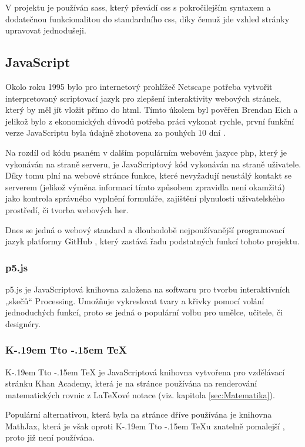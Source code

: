 \documentclass[a4paper, 12pt]{article}
\makeatletter
\newcommand*{\fullref}[1]{\hyperref[{#1}]{\ref*{#1}}}
\DeclareRobustCommand{\KaTeX}{%
  K\kern -.19em
  {\sbox \z@ T\vbox to\ht \z@ {\hbox{%
  \check@mathfonts
  \fontsize\sf@size\z@
  \selectfont A}%
  \vss}%
}\kern -.15em
\TeX}
\makeatother
\begin{document}
  V projektu je používán \gls{sass}, který převádí \gls{css} s pokročilejším syntaxem a dodatečnou funkcionalitou do standardního \gls{css}, díky čemuž jde vzhled stránky upravovat jednodušeji.


  \subsection{JavaScript} \label{sec:JavaScript}
  Okolo roku 1995 bylo pro internetový prohlížeč Netscape potřeba vytvořit interpretovaný scriptovací jazyk pro zlepšení interaktivity webových stránek, který by měl jít vložit přímo do \gls{html}. Tímto úkolem byl pověřen Brendan Eich a jelikož bylo z ekonomických důvodů potřeba práci vykonat rychle, první funkční verze JavaScriptu byla údajně zhotovena za pouhých 10 dní \cite{the-origin-of-javascript}.

  Na rozdíl od kódu psaném v dalším populárním webovém jazyce \gls{php}, který je vykonáván na straně serveru, je JavaScriptový kód vykonáván na straně uživatele. Díky tomu plní na webové stránce funkce, které nevyžadují neustálý kontakt se serverem (jelikož výměna informací tímto způsobem zpravidla není okamžitá) jako kontrola správného vyplnění formuláře, zajištění plynulosti uživatelského prostředí, či tvorba webových her.

  Dnes se jedná o webový standard a dlouhodobě nejpoužívanější programovací jazyk platformy GitHub \cite{github-statistics}, který zastává řadu podstatných funkcí tohoto projektu.


  \subsubsection{p5.js} \label{sec:p5.js}
  p5.js je JavaScriptová knihovna založena na softwaru pro tvorbu interaktivních „skečů“ Processing. Umožňuje vykreslovat tvary a křivky pomocí volání jednoduchých funkcí, proto se jedná o populární volbu pro umělce, učitele, či designéry.


  \subsubsection{\texorpdfstring{\KaTeX}{KaTeX}} \label{sec:KaTeX}
  \KaTeX{} je JavaScriptová knihovna vytvořena pro vzdělávací stránku Khan Academy, která je na stránce používána na renderování matematických rovnic z \LaTeX ové notace (viz. kapitola \fullref{sec:Matematika}).

  Populární alternativou, která byla na stránce dříve používána je knihovna MathJax, která je však oproti \KaTeX u znatelně pomalejší \cite{katex-mathjax-comparison}, proto již není používána.
\end{document}
